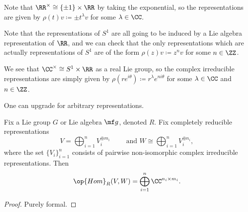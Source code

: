 \documentclass[../notes.tex]{subfiles}
\begin{document}
\begin{example}
	Note that $\RR^\times\cong\{\pm1\}\times\RR$ by taking the exponential, so the representations are given by $\rho(t)v\coloneqq\pm t^\lambda v$ for some $\lambda\in\CC$.
\end{example}
\begin{example}
	Note that the representations of $S^1$ are all going to be induced by a Lie algebra representation of $\RR$, and we can check that the only representations which are actually representations of $S^1$ are of the form $\rho(z)v\coloneqq z^nv$ for some $n\in\ZZ$.
\end{example}
\begin{example}
	We see that $\CC^\times\cong S^1\times\RR$ as a real Lie group, so the complex irreducible representations are simply given by $\rho\left(re^{i\theta}\right)\coloneqq r^\lambda e^{ni\theta}$ for some $\lambda\in\CC$ and $n\in\ZZ$.
\end{example}
One can upgrade  for arbitrary representations.
\begin{corollary}
	Fix a Lie group $G$ or Lie algebra $\mf g$, denoted $R$. Fix completely reducible representations
	\[V=\bigoplus_{i=1}^nV_i^{\oplus m_i}\qquad\text{ and }W\cong\bigoplus_{i=1}^nV_i^{\oplus n_i},\]
	where the set $\{V_i\}_{i=1}^n$ consists of pairwise non-isomorphic complex irreducible representations. Then
	\[\op{Hom}_R(V,W)=\bigoplus_{i=1}^n\CC^{n_i\times m_i}.\]
\end{corollary}
\begin{proof}
	Purely formal.\todo{}
\end{proof}
\end{document}
